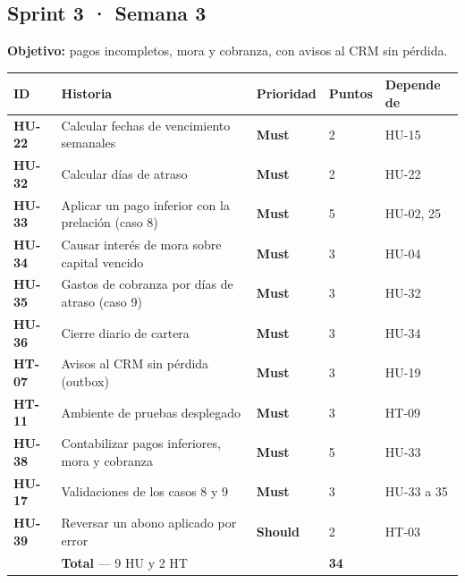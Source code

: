 \documentclass[11pt,a4paper]{article}
\newcommand{\must}{\colorbox{alerta}{\color{white}\textbf{\small Must}}}
\newcommand{\should}{\colorbox{primario}{\color{white}\textbf{\small Should}}}
\begin{document}
\subsection{Sprint 3 · Semana 3}
\noindent\textbf{Objetivo:} pagos incompletos, mora y cobranza, con avisos al CRM sin pérdida.

\begin{longtable}{>{\bfseries}p{1.2cm} p{8.6cm} p{1.5cm} p{1.1cm} p{2.2cm}}
\toprule
ID & Historia & Prioridad & Puntos & Depende de \\
\midrule
\endhead
HU-22 & Calcular fechas de vencimiento semanales & \must & 2 & HU-15 \\
HU-32 & Calcular días de atraso & \must & 2 & HU-22 \\
HU-33 & Aplicar un pago inferior con la prelación (caso 8) & \must & 5 & HU-02, 25 \\
HU-34 & Causar interés de mora sobre capital vencido & \must & 3 & HU-04 \\
HU-35 & Gastos de cobranza por días de atraso (caso 9) & \must & 3 & HU-32 \\
HU-36 & Cierre diario de cartera & \must & 3 & HU-34 \\
HT-07 & Avisos al CRM sin pérdida (outbox) & \must & 3 & HU-19 \\
HT-11 & Ambiente de pruebas desplegado & \must & 3 & HT-09 \\
HU-38 & Contabilizar pagos inferiores, mora y cobranza & \must & 5 & HU-33 \\
HU-17 & Validaciones de los casos 8 y 9 & \must & 3 & HU-33 a 35 \\
HU-39 & Reversar un abono aplicado por error & \should & 2 & HT-03 \\
\midrule
 & \textbf{Total} — 9 HU y 2 HT & & \textbf{34} & \\
\bottomrule
\end{longtable}
\end{document}
